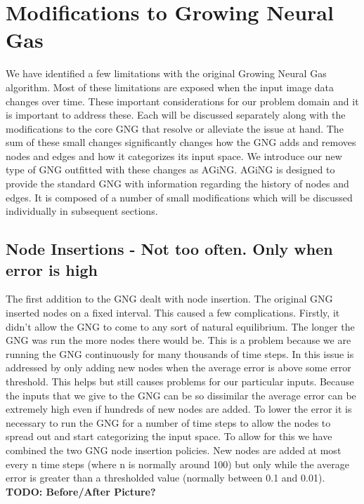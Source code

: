\documentclass{article}
\renewcommand{\|}{\origbar} %
\begin{document}
\section{Modifications to Growing Neural Gas}
\label{sec:modificationsGNG}


We have identified a few limitations with the original Growing Neural Gas algorithm. Most of these limitations are exposed when the input image data changes over time. These important considerations for our problem domain and it is important to address these. Each will be discussed separately along with the modifications to the core GNG that resolve or alleviate the issue at hand. The sum of these small changes significantly changes how the GNG adds and removes nodes and edges and how it categorizes its input space. We introduce our new type of GNG outfitted with these changes as AGiNG. AGiNG is designed to provide the standard GNG with information regarding the history of nodes and edges. It is composed of a number of small modifications which will be discussed individually in subsequent sections.

\subsection{Node Insertions - Not too often. Only when error is high}

The first addition to the GNG dealt with node insertion. The original GNG inserted nodes on a fixed interval. This caused a few complications. Firstly, it didn't allow the GNG to come to any sort of natural equilibrium. The longer the GNG was run the more nodes there would be. This is a problem because we are running the GNG continuously for many thousands of time steps. In  this issue is addressed by only adding new nodes when the average error is above some error threshold. This helps but still causes problems for our particular inputs. Because the inputs that we give to the GNG can be so dissimilar the average error can be extremely high even if hundreds of new nodes are added. To lower the error it is necessary to run the GNG for a number of time steps to allow the nodes to spread out and start categorizing the input space. To allow for this we have combined the two GNG node insertion policies. New nodes are added at most every n time steps (where n is normally around 100) but only while the average error is greater than a thresholded value (normally between 0.1 and 0.01). {\bf TODO: Before/After Picture?}
\end{document}
